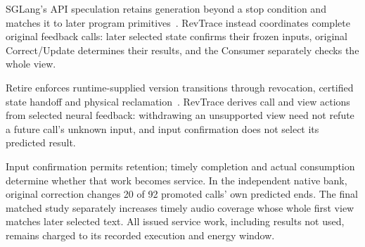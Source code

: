 
SGLang's API speculation retains generation beyond a stop condition and
matches it to later program primitives~\cite{zheng2024sglang}.
RevTrace instead coordinates complete original feedback calls: later
selected state confirms their frozen inputs, original Correct/Update
determines their results, and the Consumer separately checks the whole view.

Retire enforces runtime-supplied version transitions through revocation,
certified state handoff and physical reclamation~\cite{zhang2026retire}.
RevTrace derives call and view actions from selected neural feedback:
withdrawing an unsupported view need not refute a future call's unknown
input, and input confirmation does not select its predicted result.

Input confirmation permits retention; timely completion and actual
consumption determine whether that work becomes service.
In the independent native bank, original correction changes 20 of 92
promoted calls' own predicted ends. The final matched study separately
increases timely audio coverage whose whole first view matches later
selected text.
All issued service work, including results not used, remains charged to its
recorded execution and energy window.


